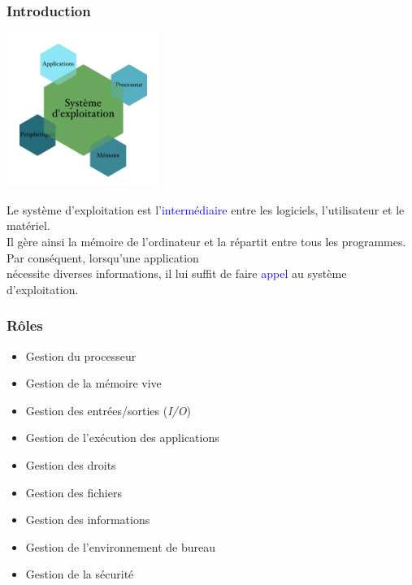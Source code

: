 \documentclass[aspectratio=169]{beamer}
\begin{document}
\begin{frame}
\frametitle{Introduction}
\begin{minipage}{5cm}
  \includegraphics[height=5cm, width=5cm]{textures/images/intro/os.pdf}
\end{minipage}%
\begin{minipage}{7cm}
  Le système d'exploitation est l'\textcolor{blue}{intermédiaire} entre les
logiciels, l'utilisateur et le matériel. \\

  Il gère ainsi la mémoire de l'ordinateur et la répartit entre tous les
programmes. \\

  Par conséquent, lorsqu'une application \\ nécessite diverses informations, il
lui suffit de faire \textcolor{blue}{appel} au système d'exploitation.
\end{minipage}
\end{frame}

\begin{frame}
  \frametitle{Rôles}
  \begin{itemize}
  \item Gestion du processeur

  \item Gestion de la mémoire vive

  \item Gestion des entrées/sorties (\textit{I/O})

  \item Gestion de l'exécution des applications

  \item Gestion des droits

  \item Gestion des fichiers

  \item Gestion des informations

  \item Gestion de l'environnement de bureau

  \item Gestion de la sécurité
  \end{itemize}
\end{frame}
\end{document}
